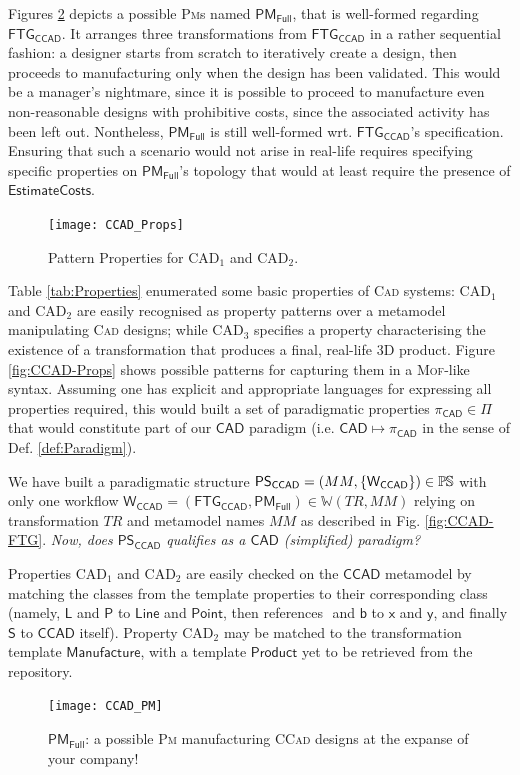 Figures \ref{fig:CCAD-PM-Full} depicts a possible \textsc{Pm}s named 
$\mathsf{PM_{Full}}$, that is well-formed regarding $\mathsf{FTG_{CCAD}}$. 
It arranges three transformations from $\mathsf{FTG_{CCAD}}$ in a rather 
sequential fashion: a designer starts from scratch to iteratively create a 
design, then proceeds to manufacturing only when the design has been 
validated. This would be a manager's nightmare, since it is possible to proceed 
to manufacture even non-reasonable designs with prohibitive costs, since the 
associated activity has been left out. Nontheless, $\mathsf{PM_{Full}}$ is 
still well-formed wrt. $\mathsf{FTG_{CCAD}}$'s specification. Ensuring that 
such a scenario would not arise in real-life requires specifying specific 
properties on $\mathsf{PM_{Full}}$'s topology that would at least require the 
presence of $\mathsf{EstimateCosts}$.
%
\begin{figure}
  \begin{center}
    \texttt{[image: CCAD\_Props]}
  \end{center}
  \caption{Pattern Properties for $\mbox{CAD}_1$ and $\mbox{CAD}_2$.}
  \label{fig:OO_PM}
\end{figure}
%
Table \ref{tab:Properties} enumerated some basic properties of \textsc{Cad} 
systems: $\mbox{CAD}_1$ and $\mbox{CAD}_2$ are easily recognised as property 
patterns over a metamodel manipulating \textsc{Cad} designs; while 
$\mbox{CAD}_3$ specifies a property characterising the existence of a 
transformation that produces a final, real-life 3D product. Figure 
\ref{fig:CCAD-Props} shows possible patterns for capturing them in a 
\textsc{Mof}-like syntax. Assuming one has explicit and appropriate languages 
for expressing all properties required, this would built a set of 
paradigmatic properties $\pi_{\mathsf{CAD}}\in\Pi$ that would constitute part of 
our $\mathsf{CAD}$ paradigm (i.e. $\mathsf{CAD} \mapsto \pi_{\mathsf{CAD}}$ in 
the sense of Def. \ref{def:Paradigm}).


We have built a paradigmatic structure $\mathsf{PS_{CCAD}} = (MM, 
\{\mathsf{W_{CCAD}}\})\in\mathbb{P}\mskip-1mu\mathbb{S}$ with only one workflow $\mathsf{W_{CCAD}} = 
(\mathsf{FTG_{CCAD}}, \mathsf{PM_{Full}})\in\mathbb{W}(TR, MM)$ relying on 
transformation $TR$ and metamodel names $MM$ as described in Fig. 
\ref{fig:CCAD-FTG}. \emph{Now, does $\mathsf{PS_{CCAD}}$ qualifies as a 
$\mathsf{CAD}$ (simplified) paradigm?}

Properties $\mbox{CAD}_1$ and $\mbox{CAD}_2$ are easily checked on the 
$\mathsf{CCAD}$ metamodel by matching the classes from the template properties 
to their corresponding class (namely, $\mathsf{L}$ and $\mathsf{P}$ to 
$\mathsf{Line}$ and $\mathsf{Point}$, then references $\mathsf{}$ and 
$\mathsf{b}$ to $\mathsf{x}$ and $\mathsf{y}$, and finally $\mathsf{S}$ to 
$\mathsf{CCAD}$ itself). Property $\mbox{CAD}_2$ may be matched to the 
transformation template $\mathsf{Manufacture}$, with a template 
$\mathsf{Product}$ yet to be retrieved from the repository.  

\begin{figure}[t]
\centering 
\texttt{[image: CCAD\_PM]}
\vspace{-1em}
\caption{$\mathsf{PM_{Full}}$: a possible \textsc{Pm} manufacturing 
\textsc{CCad} designs at the expanse of your company!} 
\label{fig:CCAD-PM-Full}%
\end{figure}
